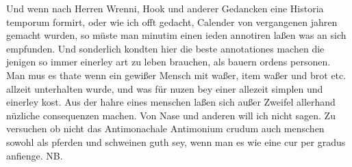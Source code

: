 \pend%
\pstart%
Und wenn nach Herren Wrenni\protect{}, Hook\protect{} und anderer Gedancken eine Historia temporum\protect{} formirt, oder wie ich offt gedacht, Calender\protect{} von vergangenen jahren gemacht wurden, so m\"{u}ste man minutim einen ieden annotiren la{\ss}en was
an sich empfunden.
Und sonderlich kondten hier die beste annotationes machen die jenigen so immer einerley art zu leben brauchen, als bauern ordens personen.
\pend%
\pstart%
Man mus
es thate wenn ein gewi{\ss}er Mensch mit wa{\ss}er, item wa{\ss}er und brot etc. allzeit unterhalten wurde,
und was f\"{u}r nuzen bey einer allezeit simplen und einerley kost.
\pend%
\pstart%
Aus der
hahre\protect{} eines menschen la{\ss}en sich au{\ss}er Zweifel allerhand n\"{u}zliche consequenzen machen.
Von Nase\protect{} und anderen will ich nicht sagen.
\pend%
\pstart%
Zu versuchen ob nicht das Antimonachale Antimonium crudum\protect{} auch menschen sowohl als pferden\protect{} und schweinen\protect{} guth sey, wenn man es wie eine cur\protect{} per gradus anfienge. NB.%
